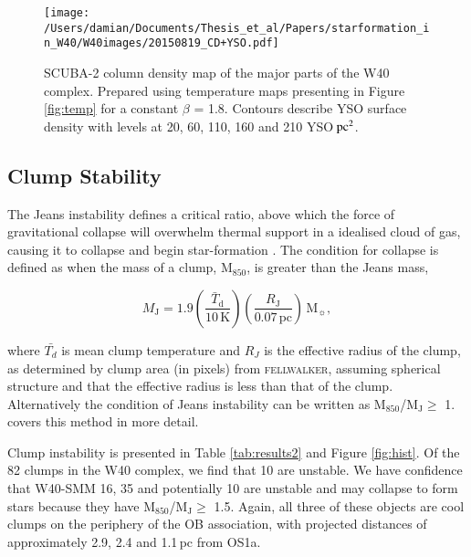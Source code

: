 \begin{figure}
\begin{center}
\texttt{[image: /Users/damian/Documents/Thesis\_et\_al/Papers/starformation\_in\_W40/W40images/20150819\_CD+YSO.pdf]}
\caption{SCUBA-2 column density map of the major parts of the W40 complex. Prepared using temperature maps presenting in Figure \ref{fig:temp} for a constant $\beta$ = 1.8. Contours describe YSO surface density with levels at 20, 60, 110, 160 and 210 YSO$\hbox{ pc$^{2}$}$.}
\label{fig:CD}
\end{center}
\end{figure}

\subsection{Clump Stability}

The Jeans instability \citep{Jeans:1902dz} defines a critical ratio, above which the force 
of gravitational collapse will overwhelm thermal support in a idealised cloud of gas, causing 
it to collapse and begin star-formation \citep{Sadavoy:2010ve,Mairs:2014zr}. The condition 
for collapse is defined as when the mass of a clump, M$_{850}$, is greater than the Jeans 
mass, 

\begin{equation}
M_{\mathrm{J}} = 1.9\left(\frac{\bar{T}_{\mathrm{d}}}{10\,\mathrm{K}} \right)\left(\frac{R_{\mathrm{J}}}{0.07\,\mathrm{pc}} \right)\,\mathrm{M}_{{{\sun}}}, 
\label{eqn:sadavoy}
\end{equation}

where $\bar{T_{d}}$ is mean clump temperature and $R_{J}$ is the effective radius 
of the clump, as determined by clump area (in pixels) from \textsc{fellwalker}, assuming 
spherical structure and that the effective radius is less than that of the clump. Alternatively 
the condition of Jeans instability can be written as M$_{850}$/M$_{\mathrm{J}} \geq$  1. 
\cite{Rumble:2015vn} covers this method in more detail. 

Clump instability is presented in Table \ref{tab:results2} and Figure \ref{fig:hist}. Of the 82 
clumps in the W40 complex, we find that 10 are unstable. We have confidence that 
W40-SMM 16, 35 and potentially 10 are unstable and may collapse to form stars because 
they have M$_{850}$/M$_{\mathrm{J}} \geq$  1.5. Again, all three of these objects are cool 
clumps on the periphery of the OB association, with projected distances of approximately 
2.9, 2.4 and 1.1\,pc from OS1a. 


